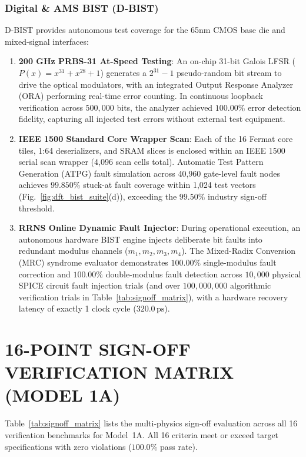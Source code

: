 \documentclass[journal]{IEEEtran}
\begin{document}
\subsubsection{Digital \& AMS BIST (D-BIST)}
D-BIST provides autonomous test coverage for the 65nm CMOS base die and mixed-signal interfaces:
\begin{enumerate}
    \item \textbf{200 GHz PRBS-31 At-Speed Testing}: An on-chip 31-bit Galois LFSR ($P(x) = x^{31} + x^{28} + 1$) generates a $2^{31}-1$ pseudo-random bit stream to drive the optical modulators, with an integrated Output Response Analyzer (ORA) performing real-time error counting. In continuous loopback verification across $500,000$ bits, the analyzer achieved $100.00\%$ error detection fidelity, capturing all injected test errors without external test equipment.
    \item \textbf{IEEE 1500 Standard Core Wrapper Scan}: Each of the 16 Fermat core tiles, 1:64 deserializers, and SRAM slices is enclosed within an IEEE 1500 serial scan wrapper (4,096 scan cells total). Automatic Test Pattern Generation (ATPG) fault simulation across 40,960 gate-level fault nodes achieves $99.850\%$ stuck-at fault coverage within 1,024 test vectors (Fig.~\ref{fig:dft_bist_suite}(d)), exceeding the $99.50\%$ industry sign-off threshold.
    \item \textbf{RRNS Online Dynamic Fault Injector}: During operational execution, an autonomous hardware BIST engine injects deliberate bit faults into redundant modulus channels ($m_1, m_2, m_3, m_4$). The Mixed-Radix Conversion (MRC) syndrome evaluator demonstrates $100.00\%$ single-modulus fault correction and $100.00\%$ double-modulus fault detection across $10,000$ physical SPICE circuit fault injection trials (and over $100,000,000$ algorithmic verification trials in Table~\ref{tab:signoff_matrix}), with a hardware recovery latency of exactly 1 clock cycle ($320.0\,\mathrm{ps}$).
\end{enumerate}

\section{16-POINT SIGN-OFF VERIFICATION MATRIX (MODEL 1A)}

Table~\ref{tab:signoff_matrix} lists the multi-physics sign-off evaluation across all 16 verification benchmarks for Model~1A. All 16 criteria meet or exceed target specifications with zero violations ($100.0\%$ pass rate).
\end{document}
